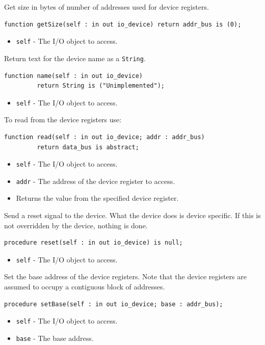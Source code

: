 \documentclass[10pt, openany]{book}
\newcommand{\keyword}[1]{\texttt{#1}}
\newcommand{\datatype}[1]{\texttt{#1}}
\begin{document}
Get size in bytes of number of addresses used for device registers.
\begin{lstlisting}
function getSize(self : in out io_device) return addr_bus is (0);
\end{lstlisting}
\begin{itemize}
  \item \keyword{self} - The I/O object to access.
\end{itemize}

Return text for the device name as a \datatype{String}.
\begin{lstlisting}
function name(self : in out io_device)
         return String is ("Unimplemented");
\end{lstlisting}
\begin{itemize}
  \item \keyword{self} - The I/O object to access.
\end{itemize}

To read from the device registers use:
\begin{lstlisting}
function read(self : in out io_device; addr : addr_bus)
         return data_bus is abstract;
\end{lstlisting}
\begin{itemize}
  \item \keyword{self} - The I/O object to access.
  \item \keyword{addr} - The address of the device register to access.
  \item Returns the value from the specified device register.
\end{itemize}

Send a reset signal to the device.
What the device does is device specific.
If this is not overridden by the device, nothing is done.
\begin{lstlisting}
procedure reset(self : in out io_device) is null;
\end{lstlisting}
\begin{itemize}
  \item \keyword{self} - The I/O object to access.
\end{itemize}

Set the base address of the device registers.
Note that the device registers are assumed to occupy a contiguous block of addresses.
\begin{lstlisting}
procedure setBase(self : in out io_device; base : addr_bus);
\end{lstlisting}
\begin{itemize}
  \item \keyword{self} - The I/O object to access.
  \item \keyword{base} - The base address.
\end{itemize}
\end{document}
